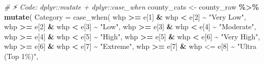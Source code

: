 \documentclass[
  12pt,
]{scrreprt}
\newenvironment{Shaded}{\begin{snugshade}}{\end{snugshade}}
\newcommand{\AttributeTok}[1]{\textcolor[rgb]{0.13,0.29,0.53}{#1}}
\newcommand{\CommentTok}[1]{\textcolor[rgb]{0.56,0.35,0.01}{\textit{#1}}}
\newcommand{\DecValTok}[1]{\textcolor[rgb]{0.00,0.00,0.81}{#1}}
\newcommand{\FunctionTok}[1]{\textcolor[rgb]{0.13,0.29,0.53}{\textbf{#1}}}
\newcommand{\NormalTok}[1]{#1}
\newcommand{\OtherTok}[1]{\textcolor[rgb]{0.56,0.35,0.01}{#1}}
\newcommand{\SpecialCharTok}[1]{\textcolor[rgb]{0.81,0.36,0.00}{\textbf{#1}}}
\newcommand{\StringTok}[1]{\textcolor[rgb]{0.31,0.60,0.02}{#1}}
\begin{document}
\begin{Shaded}
\begin{Highlighting}[]
\CommentTok{\# ⚡ Code:  dplyr::mutate + dplyr::case\_when}
\StringTok{\textasciigrave{}}\AttributeTok{county\_cats}\StringTok{\textasciigrave{}} \OtherTok{\textless{}{-}}\NormalTok{ county\_raw }\SpecialCharTok{\%\textgreater{}\%}
  \FunctionTok{mutate}\NormalTok{(}
    \AttributeTok{Category =} \StringTok{\textasciigrave{}}\AttributeTok{case\_when}\StringTok{\textasciigrave{}}\NormalTok{(}
\NormalTok{      whp }\SpecialCharTok{\textgreater{}=}\NormalTok{ e[}\StringTok{\textasciigrave{}}\AttributeTok{1}\StringTok{\textasciigrave{}}\NormalTok{] }\SpecialCharTok{\&}\NormalTok{ whp }\SpecialCharTok{\textless{}}\NormalTok{  e[}\StringTok{\textasciigrave{}}\AttributeTok{2}\StringTok{\textasciigrave{}}\NormalTok{] }\SpecialCharTok{\textasciitilde{}} \StringTok{\textasciigrave{}}\AttributeTok{"Very Low"}\StringTok{\textasciigrave{}}\NormalTok{,}
\NormalTok{      whp }\SpecialCharTok{\textgreater{}=}\NormalTok{ e[}\DecValTok{2}\NormalTok{]  }\SpecialCharTok{\&}\NormalTok{ whp }\SpecialCharTok{\textless{}}\NormalTok{  e[}\DecValTok{3}\NormalTok{]  }\SpecialCharTok{\textasciitilde{}} \StringTok{"Low"}\NormalTok{,}
\NormalTok{      whp }\SpecialCharTok{\textgreater{}=}\NormalTok{ e[}\DecValTok{3}\NormalTok{]  }\SpecialCharTok{\&}\NormalTok{ whp }\SpecialCharTok{\textless{}}\NormalTok{  e[}\DecValTok{4}\NormalTok{]  }\SpecialCharTok{\textasciitilde{}} \StringTok{"Moderate"}\NormalTok{,}
\NormalTok{      whp }\SpecialCharTok{\textgreater{}=}\NormalTok{ e[}\DecValTok{4}\NormalTok{]  }\SpecialCharTok{\&}\NormalTok{ whp }\SpecialCharTok{\textless{}}\NormalTok{  e[}\DecValTok{5}\NormalTok{]  }\SpecialCharTok{\textasciitilde{}} \StringTok{"High"}\NormalTok{,}
\NormalTok{      whp }\SpecialCharTok{\textgreater{}=}\NormalTok{ e[}\DecValTok{5}\NormalTok{]  }\SpecialCharTok{\&}\NormalTok{ whp }\SpecialCharTok{\textless{}}\NormalTok{  e[}\DecValTok{6}\NormalTok{]  }\SpecialCharTok{\textasciitilde{}} \StringTok{"Very High"}\NormalTok{,}
\NormalTok{      whp }\SpecialCharTok{\textgreater{}=}\NormalTok{ e[}\DecValTok{6}\NormalTok{]  }\SpecialCharTok{\&}\NormalTok{ whp }\SpecialCharTok{\textless{}}\NormalTok{  e[}\DecValTok{7}\NormalTok{]  }\SpecialCharTok{\textasciitilde{}} \StringTok{"Extreme"}\NormalTok{,}
\NormalTok{      whp }\SpecialCharTok{\textgreater{}=}\NormalTok{ e[}\StringTok{\textasciigrave{}}\AttributeTok{7}\StringTok{\textasciigrave{}}\NormalTok{] }\SpecialCharTok{\&}\NormalTok{ whp }\StringTok{\textasciigrave{}}\AttributeTok{\textless{}=}\StringTok{\textasciigrave{}}\NormalTok{ e[}\StringTok{\textasciigrave{}}\AttributeTok{8}\StringTok{\textasciigrave{}}\NormalTok{] }\SpecialCharTok{\textasciitilde{}} \StringTok{\textasciigrave{}}\AttributeTok{"Ultra (Top 1\%)"}\StringTok{\textasciigrave{}}\NormalTok{,}

\end{Highlighting}
\end{Shaded}
\end{document}

